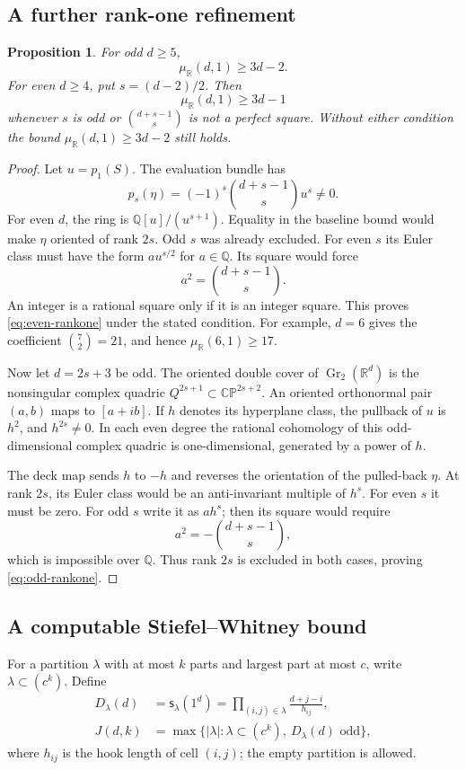 \documentclass[11pt]{article}
\newtheorem{proposition}[theorem]{Proposition}
\theoremstyle{definition}
\newcommand{\R}{\mathbb R}
\newcommand{\Q}{\mathbb Q}
\newcommand{\Gr}{\operatorname{Gr}}
\newcommand{\muR}{\mu_{\R}}
\newcommand{\Sch}{\mathsf{s}}
\newcommand{\cp}{\mathbb{CP}}
\begin{document}
\subsection{A further rank-one refinement}\label{subsec:rankone}
\begin{proposition}\label{prop:rankone}
For odd $d\geq5$,
\begin{equation}\label{eq:odd-rankone}
 \muR(d,1)\geq3d-2.
\end{equation}
For even $d\geq4$, put $s=(d-2)/2$. Then
\begin{equation}\label{eq:even-rankone}
 \muR(d,1)\geq3d-1
\end{equation}
whenever $s$ is odd or $\binom{d+s-1}{s}$ is not a perfect square. Without either condition the bound $\muR(d,1)\geq3d-2$ still holds.
\end{proposition}
\begin{proof}
Let $u=p_1(S)$. The evaluation bundle has
\[
 p_s(\eta)=(-1)^s\binom{d+s-1}{s}u^s\neq0.
\]
For even $d$, the ring is $\Q[u]/(u^{s+1})$. Equality in the baseline bound would make $\eta$ oriented of rank $2s$. Odd $s$ was already excluded. For even $s$ its Euler class must have the form $a u^{s/2}$ for $a\in\Q$. Its square would force
\[
 a^2=\binom{d+s-1}{s}.
\]
An integer is a rational square only if it is an integer square. This proves \eqref{eq:even-rankone} under the stated condition. For example, $d=6$ gives the coefficient $\binom72=21$, and hence $\muR(6,1)\geq17$.

Now let $d=2s+3$ be odd. The oriented double cover of $\Gr_2(\R^d)$ is the nonsingular complex quadric $Q^{2s+1}\subset\cp^{2s+2}$. An oriented orthonormal pair $(a,b)$ maps to $[a+ib]$. If $h$ denotes its hyperplane class, the pullback of $u$ is $h^2$, and $h^{2s}\neq0$. In each even degree the rational cohomology of this odd-dimensional complex quadric is one-dimensional, generated by a power of $h$.

The deck map sends $h$ to $-h$ and reverses the orientation of the pulled-back $\eta$. At rank $2s$, its Euler class would be an anti-invariant multiple of $h^s$. For even $s$ it must be zero. For odd $s$ write it as $a h^s$; then its square would require
\[
 a^2=-\binom{d+s-1}{s},
\]
which is impossible over $\Q$. Thus rank $2s$ is excluded in both cases, proving \eqref{eq:odd-rankone}.
\end{proof}

\subsection{A computable Stiefel--Whitney bound}\label{subsec:sw}
For a partition $\lambda$ with at most $k$ parts and largest part at most $c$, write $\lambda\subset(c^k)$. Define
\begin{align}
 D_\lambda(d)&=\Sch_\lambda(1^d)
 =\prod_{(i,j)\in\lambda}\frac{d+j-i}{h_{ij}},\label{eq:hook}\\
 J(d,k)&=\max\{|\lambda|:\lambda\subset(c^k),\ D_\lambda(d)\text{ odd}\},\label{eq:J}
\end{align}
where $h_{ij}$ is the hook length of cell $(i,j)$; the empty partition is allowed.
\end{document}
